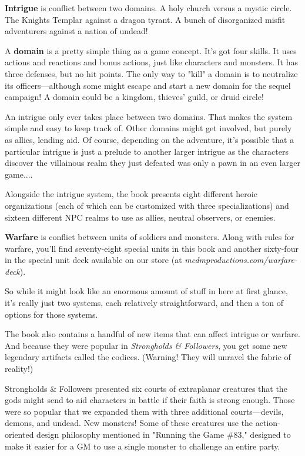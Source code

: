 \documentclass[10pt,a4paper,twoside,bg=print,twocolumn,openany,nodeprecatedcode]{dndbook}
\begin{document}
\textbf{Intrigue} is conflict between two domains. A holy church versus a mystic circle. The Knights Templar against a dragon tyrant. A bunch of disorganized misfit adventurers against a nation of undead!

A \textbf{domain} is a pretty simple thing as a game concept. It's got four skills. It uses actions and reactions and bonus actions, just like characters and monsters. It has three defenses, but no hit points. The only way to "kill" a domain is to neutralize its officers—although some might escape and start a new domain for the sequel campaign! A domain could be a kingdom, thieves' guild, or druid circle!

An intrigue only ever takes place between two domains. That makes the system simple and easy to keep track of. Other domains might get involved, but purely as allies, lending aid. Of course, depending on the adventure, it's possible that a particular intrigue is just a prelude to another larger intrigue as the characters discover the villainous realm they just defeated was only a pawn in an even larger game....

Alongside the intrigue system, the book presents eight different heroic organizations (each of which can be customized with three specializations) and sixteen different NPC realms to use as allies, neutral observers, or enemies.

\textbf{Warfare} is conflict between units of soldiers and monsters. Along with rules for warfare, you'll find seventy-eight special units in this book and another sixty-four in the special unit deck available on our store (at \textit{mcdmproductions.com/warfare-deck}).

So while it might look like an enormous amount of stuff in here at first glance, it's really just two systems, each relatively straightforward, and then a ton of options for those systems.

The book also contains a handful of new items that can affect intrigue or warfare. And because they were popular in \textit{Strongholds \& Followers}, you get some new legendary artifacts called the codices. (Warning! They will unravel the fabric of reality!)

Strongholds \& Followers presented six courts of extraplanar creatures that the gods might send to aid characters in battle if their faith is strong enough. Those were so popular that we expanded them with three additional courts—devils, demons, and undead. New monsters! Some of these creatures use the action-oriented design philosophy mentioned in "Running the Game \#83," designed to make it easier for a GM to use a single monster to challenge an entire party.
\end{document}
